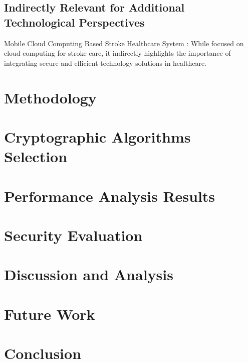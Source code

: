 \documentclass[cic,tc,english]{iiufrgs}
\begin{document}
\section{Indirectly Relevant for Additional Technological Perspectives}

    Mobile Cloud Computing Based Stroke Healthcare System \cite{Karaca2019}: While focused on cloud computing for stroke care, it indirectly highlights the importance of integrating secure and efficient technology solutions in healthcare.

\chapter{Methodology}


\chapter{Cryptographic Algorithms Selection}


\chapter{Performance Analysis Results}


\chapter{Security Evaluation}


\chapter{Discussion and Analysis}


\chapter{Future Work}


\chapter{Conclusion}



\end{document}
